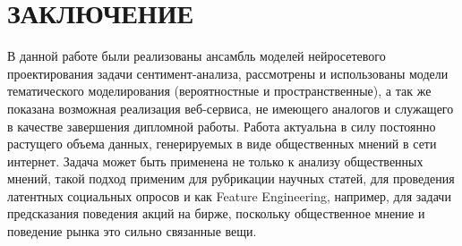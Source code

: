 \chapter{ЗАКЛЮЧЕНИЕ}

В данной работе были реализованы ансамбль моделей нейросетевого проектирования задачи сентимент-анализа, рассмотрены и использованы модели тематического моделирования (вероятностные и пространственные), а так же показана возможная реализация веб-сервиса, не имеющего аналогов и служащего в качестве завершения дипломной работы. Работа актуальна в силу постоянно растущего объема данных, генерируемых в виде общественных мнений в сети интернет. Задача может быть применена не только к анализу общественных мнений, такой подход применим для рубрикации научных статей, для проведения латентных социальных опросов и как Feature Engineering, например, для задачи предсказания поведения акций на бирже, поскольку общественное мнение и поведение рынка это сильно связанные вещи.